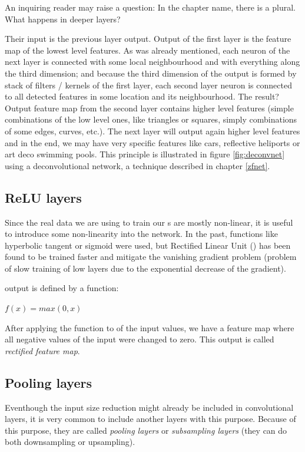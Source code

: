 An inquiring reader may raise a question: In the chapter name, there is a 
plural. What happens in deeper layers? 

Their input is the previous layer output. Output of the first layer is the 
feature map of the lowest level features. As was already mentioned, each neuron 
of the next layer is connected with some local neighbourhood and with everything 
along the third dimension; and because the third dimension of the output is 
formed by stack of filters / kernels of the first layer, each second layer 
neuron is connected to all detected features in some location and its 
neighbourhood. The result? Output feature map from the second layer contains 
higher level features (simple combinations of the low level ones, like triangles 
or squares, simply combinations of some edges, curves, etc.). The next layer 
will output again higher level features and in the end, we may have very 
specific features like cars, reflective heliports or art deco swimming pools. 
This principle is illustrated in figure \ref{fig:deconvnet} using a 
deconvolutional network, a technique described in chapter \ref{zfnet}.

\subsection{ReLU layers}
\label{relu-layers}

Since the real data we are using to train our s are mostly non-linear, 
it is useful to introduce some non-linearity into the network. In the past, 
functions like hyperbolic tangent or sigmoid were used, but Rectified Linear 
Unit () has been found to be trained faster and mitigate the vanishing 
gradient problem (problem of slow training of low layers due to the exponential 
decrease of the gradient). 

 output is defined by a function:

$f(x) = max(0, x)$

After applying the  function to of the input values, we have a feature 
map where all negative values of the input were changed to zero. This output is 
called \textit{rectified feature map}. 

\subsection{Pooling layers}
\label{pooling}

Eventhough the input size reduction might already be included in convolutional 
layers, it is very common to include another layers with this purpose. Because 
of this purpose, they are called \textit{pooling layers} or \textit{subsampling 
layers} (they can do both downsampling or upsampling). 

